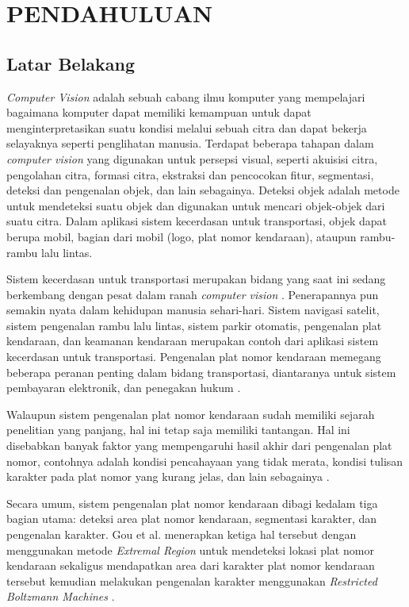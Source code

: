 \chapter{PENDAHULUAN}

\vspace{4.5pt}

\section{Latar Belakang} \label{sec:latar_belakang}
\noindent \textit{Computer Vision} adalah sebuah cabang ilmu komputer yang mempelajari bagaimana komputer dapat memiliki kemampuan untuk dapat menginterpretasikan suatu kondisi melalui sebuah citra dan dapat bekerja selayaknya seperti penglihatan manusia. Terdapat beberapa tahapan dalam \textit{computer vision} yang digunakan untuk persepsi visual, seperti akuisisi citra, pengolahan citra, formasi citra, ekstraksi dan pencocokan fitur, segmentasi, deteksi dan pengenalan objek, dan lain sebagainya. Deteksi objek adalah metode untuk mendeteksi suatu objek dan digunakan untuk mencari objek-objek dari suatu citra. Dalam aplikasi sistem kecerdasan untuk transportasi, objek dapat berupa mobil, bagian dari mobil (logo, plat nomor kendaraan), ataupun rambu-rambu lalu lintas.

\noindent Sistem kecerdasan untuk transportasi merupakan bidang yang saat ini sedang berkembang dengan pesat dalam ranah \textit{computer vision} \cite{tabrizi}. Penerapannya pun semakin nyata dalam kehidupan manusia sehari-hari. Sistem navigasi satelit, sistem pengenalan rambu lalu lintas, sistem parkir otomatis, pengenalan plat kendaraan, dan keamanan kendaraan merupakan contoh dari aplikasi sistem kecerdasan untuk transportasi. Pengenalan plat nomor kendaraan memegang beberapa peranan penting dalam bidang transportasi, diantaranya untuk sistem pembayaran elektronik, dan penegakan hukum \cite{gou2014}.

\noindent Walaupun sistem pengenalan plat nomor kendaraan sudah memiliki sejarah penelitian yang panjang, hal ini tetap saja memiliki tantangan. Hal ini disebabkan banyak faktor yang mempengaruhi hasil akhir dari pengenalan plat nomor, contohnya adalah kondisi pencahayaan yang tidak merata, kondisi tulisan karakter pada plat nomor yang kurang jelas, dan lain sebagainya \cite{gou2014}.

\noindent Secara umum, sistem pengenalan plat nomor kendaraan dibagi kedalam tiga bagian utama: deteksi area plat nomor kendaraan, segmentasi karakter, dan pengenalan karakter. Gou et al. menerapkan ketiga hal tersebut dengan menggunakan metode \textit{Extremal Region} untuk mendeteksi lokasi plat nomor kendaraan sekaligus mendapatkan area dari karakter plat nomor kendaraan tersebut kemudian melakukan pengenalan karakter menggunakan \textit{Restricted Boltzmann Machines} \cite{gou2016}.


